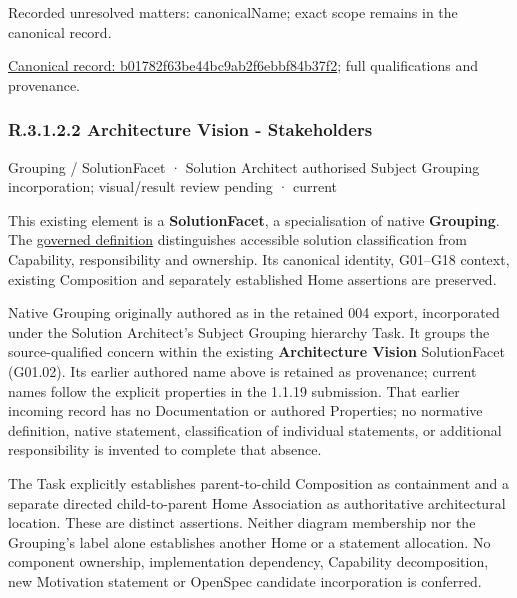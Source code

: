 {\small Recorded unresolved matters: canonicalName; exact scope remains in the canonical record.}\par
{\footnotesize \href{../../../../../../../continuum/grouping/b01782f63be44bc9ab2f6ebbf84b37f2.md}{Canonical record: b01782f63be44bc9ab2f6ebbf84b37f2}; full qualifications and provenance.}\par
\subsubsection*{R.3.1.2.2 Architecture Vision - Stakeholders}
\label{navigation:R.3.1.2.2}

\label{element:4f80f28b3dad490abe942e5bb37e1a80}
{\small Grouping / SolutionFacet · Solution Architect authorised Subject Grouping incorporation; visual/result review pending · current}\par

This existing element is a \textbf{SolutionFacet}, a specialisation of native
\textbf{Grouping}. The \href{\detokenize{../../../../../../../governance/continuum-representation.md#solutionfacet-classification--1119-candidate}}{governed definition}
distinguishes accessible solution classification from Capability, responsibility
and ownership. Its canonical identity, G01–G18 context, existing Composition
and separately established Home assertions are preserved.



Native Grouping originally authored as \texttt{} in the retained 004 export,
incorporated under the Solution Architect's Subject Grouping hierarchy Task.
It groups the source-qualified \texttt{} concern within
the existing \textbf{Architecture Vision} SolutionFacet (G01.02). Its earlier authored name above is retained as provenance; current names
follow the explicit properties in the 1.1.19 submission.
That earlier incoming record has no Documentation or authored Properties; no normative
definition, native statement, classification of individual statements, or
additional responsibility is invented to complete that absence.



The Task explicitly establishes parent-to-child Composition as containment and
a separate directed child-to-parent Home Association as authoritative architectural
location. These are distinct assertions. Neither diagram membership nor the
Grouping's label alone establishes another Home or a statement allocation.
No component ownership, implementation dependency, Capability decomposition,
new Motivation statement or OpenSpec candidate incorporation is conferred.



